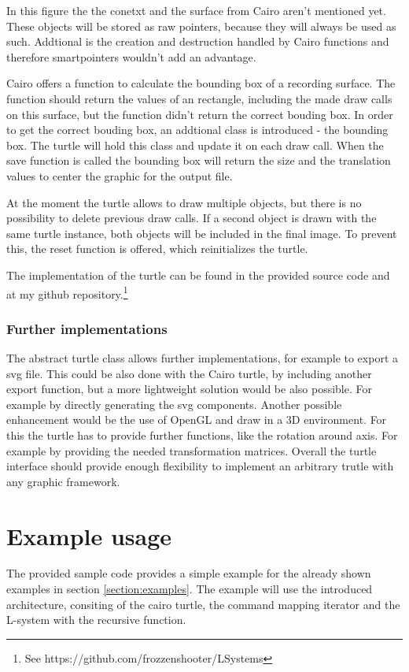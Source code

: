 \documentclass[english]{cpp-hmwk}
\begin{document}
\noindent In this figure the the conetxt and the surface from Cairo aren't mentioned yet. These objects will be stored as raw pointers, because they will always be used as such. Addtional is the creation and destruction handled by Cairo functions and therefore smartpointers wouldn't add an advantage.\newline

\noindent Cairo offers a function to calculate the bounding box of a recording surface. The function should return the values of an rectangle, including the made draw calls on this surface, but the function didn't return the correct bouding box. In order to get the correct bouding box, an addtional class is introduced - the bounding box. The turtle will hold this class and update it on each draw call. When the save function is called the bounding box will return the size and the translation values to center the graphic for the output file.

\noindent At the moment the turtle allows to draw multiple objects, but there is no possibility to delete previous draw calls. If a second object is drawn with the same turtle instance, both objects will be included in the final image. To prevent this, the reset function is offered, which reinitializes the turtle.

The implementation of the turtle can be found in the provided source code and at my github repository.\footnote{See https://github.com/frozzenshooter/LSystems}

\subsubsection{Further implementations}
The abstract turtle class allows further implementations, for example to export a svg file. This could be also done with the Cairo turtle, by including another export function, but a more lightweight solution would be also possible. For example by directly generating the svg components. Another possible enhancement would be the use of OpenGL and draw in a 3D environment. For this the turtle has to provide further functions, like the rotation around axis. For example by providing the needed transformation matrices. Overall the turtle interface should provide enough flexibility to implement an arbitrary trutle with any graphic framework.

\section{Example usage}
The provided sample code provides a simple example for the already shown examples in section \ref{section:examples}. The example will use the introduced architecture, consiting of the cairo turtle, the command mapping iterator and the L-system with the recursive function. 
\end{document}

